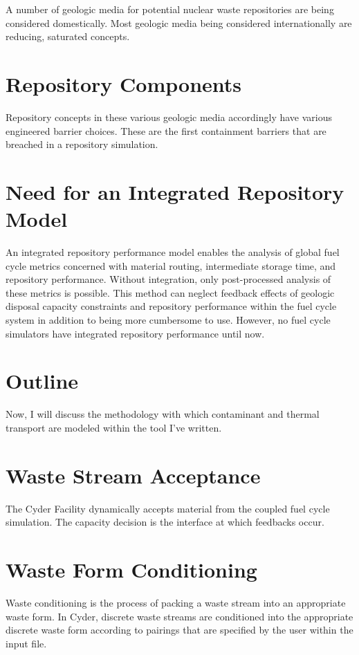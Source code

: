\documentclass[letterpaper]{article}
\begin{document}
A number of geologic media for potential nuclear waste repositories are being 
considered domestically. Most geologic media being considered internationally are 
reducing, saturated concepts.  

\section{Repository Components}

Repository concepts in these various geologic media accordingly have various 
engineered barrier choices. These are the first containment barriers that are 
breached in a repository simulation.

\section{Need for an Integrated Repository Model}

An integrated repository performance model enables the analysis of global fuel 
cycle metrics concerned with material routing, intermediate storage time, and 
repository performance.  Without integration, only post-processed analysis of 
these metrics is possible. This method can neglect feedback effects of geologic 
disposal capacity constraints and repository performance within the fuel cycle 
system in addition to being more cumbersome to use. However, no fuel cycle 
simulators have integrated repository performance until now. 

\section{Outline}

Now, I will discuss the methodology with which contaminant and thermal 
transport are modeled within the tool I've written.

\section{Waste Stream Acceptance}

The Cyder Facility dynamically accepts material from the coupled fuel
cycle simulation. The capacity decision is the interface at which feedbacks 
occur.

\section{Waste Form Conditioning}

Waste conditioning is the process of packing a waste stream into an appropriate 
waste form.  In Cyder, discrete waste streams are conditioned into the 
appropriate discrete waste form according to pairings that are specified by the 
user within the input file.
\end{document}
